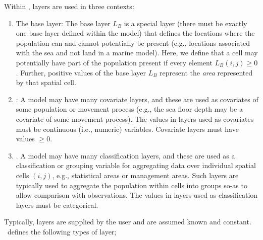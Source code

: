 Within \SPM, layers are used in three contexts:
\begin{enumerate}
\item The base layer: The base layer $L_B$ is a special layer (there must be exactly one base layer defined within the model) that defines the locations where the population can and cannot potentially be present (e.g., locations associated with the sea and not land in a marine model). Here, we define that a cell may potentially have part of the population present if every element $L_B(i,j) \ge 0$. Further, positive values of the base layer $L_B$ represent the \emph{area} represented by that spatial cell. 
\item {}: A model may have many covariate layers, and these are used as covariates of some population or movement process (e.g., the sea floor depth may be a covariate of some movement process). The values in layers used as covariates must be continuous (i.e., numeric) variables. Covariate layers must have values $\ge0$.
\item {}. A model may have many classification layers, and these are used as a classification or grouping variable for aggregating data over individual spatial cells $(i,j)$, e.g., statistical areas or management areas. Such layers are typically used to aggregate the population within cells into groups so-as to allow comparison with observations. The values in layers used as classification layers must be categorical.
\end{enumerate}

Typically, layers are supplied by the user and are assumed known and constant. \SPM\ defines the following types of layer;

